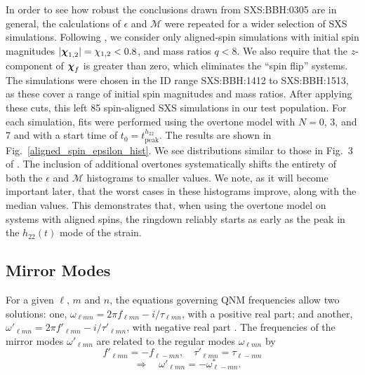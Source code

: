 In order to see how robust the conclusions drawn from SXS:BBH:0305 are in general, the calculations of $\epsilon$ and $\mathcal{M}$ were repeated for a wider selection of SXS simulations. Following \cite{Giesler:2019uxc}, we consider only aligned-spin simulations with initial spin magnitudes $|\vb*{\chi}_{1,2}| = \chi_{1,2} < 0.8$, and mass ratios $q < 8$. We also require that the $z$-component of $\vb*{\chi}_f$ is greater than zero, which eliminates the ``spin flip'' systems. The simulations were chosen in the ID range SXS:BBH:1412 to SXS:BBH:1513, as these cover a range of initial spin magnitudes and mass ratios.
After applying these cuts, this left 85 spin-aligned SXS simulations in our test population.
For each simulation, fits were performed using the overtone model with $N=0$, 3, and 7 and with a start time of $t_0 = t_{\mathrm{peak}}^{h_{22}}$. 
The results are shown in Fig.~\ref{aligned_spin_epsilon_hist}. 
We see distributions similar to those in Fig.~3 of \cite{Giesler:2019uxc}. 
The inclusion of additional overtones systematically shifts the entirety of both the $\epsilon$ and $\mathcal{M}$ histograms to smaller values.
We note, as it will become important later, that the worst cases in these histograms improve, along with the median values.
This demonstrates that, when using the overtone model on systems with aligned spins, the ringdown reliably starts as early as the peak in the $h_{22}(t)$ mode of the strain. 


\subsection{Mirror Modes} \label{subsec:mirror_modes}

For a given $\ell$, $m$ and $n$, the equations governing QNM frequencies allow two solutions: one, $\omega_{\ell m n} = 2\pi f_{\ell m n} - i/\tau_{\ell m n}$, with a positive real part; and another, $\omega'_{\ell m n} = 2\pi f'_{\ell m n} - i/ \tau'_{\ell m n}$, with negative real part \cite{Dhani:2020nik, Berti:2005ys}.
The frequencies of the mirror modes $\omega'_{\ell m n}$ are related to the regular modes $\omega_{\ell m n}$ by
\begin{equation}\label{mirrorsymmetry}
    f'_{\ell m n} = -f_{\ell -m n}, \quad \tau'_{\ell m n} = \tau_{\ell -m n} \nonumber
\end{equation}
\begin{equation} 
    \quad\Rightarrow\quad \omega'_{\ell mn} = - \omega_{\ell -mn}^*.
    \label{eq:sym_mirror_modes_conj}
\end{equation}

